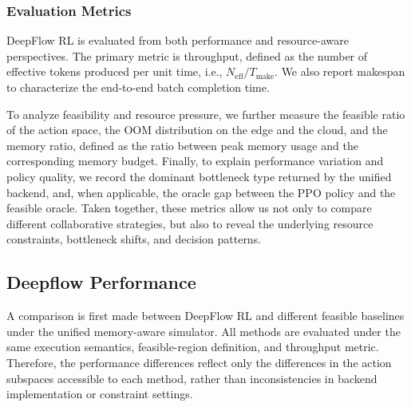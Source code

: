 \documentclass[a4paper,fleqn]{cas-dc}
\begin{document}
\subsubsection{Evaluation Metrics}

DeepFlow RL is evaluated from both performance and resource-aware perspectives. The primary metric is throughput, defined as the number of effective tokens produced per unit time, i.e., $N_{\mathrm{eff}} / T_{\mathrm{make}}$. We also report makespan to characterize the end-to-end batch completion time.

To analyze feasibility and resource pressure, we further measure the feasible ratio of the action space, the OOM distribution on the edge and the cloud, and the memory ratio, defined as the ratio between peak memory usage and the corresponding memory budget. Finally, to explain performance variation and policy quality, we record the dominant bottleneck type returned by the unified backend, and, when applicable, the oracle gap between the PPO policy and the feasible oracle. Taken together, these metrics allow us not only to compare different collaborative strategies, but also to reveal the underlying resource constraints, bottleneck shifts, and decision patterns.

\subsection{Deepflow Performance}

A comparison is first made between DeepFlow RL and different feasible baselines under the unified memory-aware simulator. All methods are evaluated under the same execution semantics, feasible-region definition, and throughput metric. Therefore, the performance differences reflect only the differences in the action subspaces accessible to each method, rather than inconsistencies in backend implementation or constraint settings.
\end{document}
